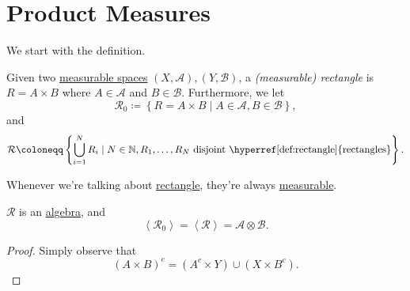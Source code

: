 \section{Product Measures}
We start with the definition.
\begin{definition}[Rectangle]\label{def:rectangle}
	Given two \hyperref[def:measurable-space]{measurable spaces} \((X, \mathcal{A} ), (Y, \mathcal{B} )\),
	a \emph{(measurable) rectangle} is \(R = A\times B\) where \(A\in \mathcal{A} \)
	and \(B\in \mathcal{B} \). Furthermore, we let
	\[
		\mathcal{R} _0 \coloneqq \left\{R = A\times B \mid A\in \mathcal{A} , B\in \mathcal{B} \right\},
	\]
	and
	\[
		\mathcal{R} \coloneqq \left\{\bigcup\limits_{i=1}^{N} R_{i} \mid N\in \mathbb{N} , R_1, \dots , R_N \text{ disjoint \hyperref[def:rectangle]{rectangles}}\right\}.
	\]
\end{definition}
\begin{note}
	Whenever we're talking about \hyperref[def:rectangle]{rectangle}, they're always \hyperref[def:measurable-set]{measurable}.
\end{note}

\begin{lemma}
	\(\mathcal{R} \) is an \hyperref[def:algebra]{algebra}, and
	\[
		\left< \mathcal{R} _0 \right> = \left< \mathcal{R}  \right> = \mathcal{A} \otimes \mathcal{B}.
	\]
\end{lemma}
\begin{proof}
	Simply observe that
	\[
		(A\times B)^{c} = (A^{c} \times Y)\cup (X\times B^{c} ).
	\]
\end{proof}